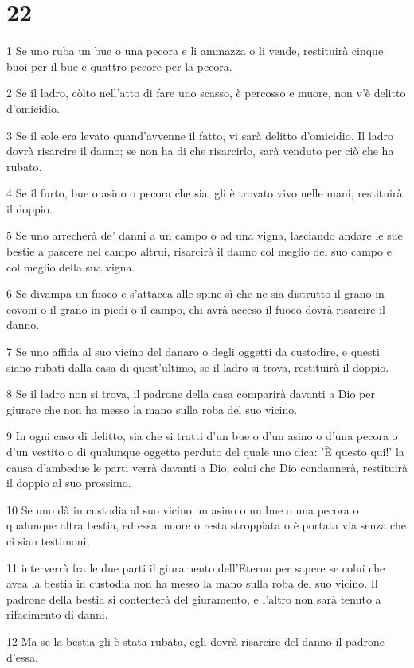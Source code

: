 \chapter{22}

\par 1 Se uno ruba un bue o una pecora e li ammazza o li vende, restituirà cinque buoi per il bue e quattro pecore per la pecora.
\par 2 Se il ladro, còlto nell'atto di fare uno scasso, è percosso e muore, non v'è delitto d'omicidio.
\par 3 Se il sole era levato quand'avvenne il fatto, vi sarà delitto d'omicidio. Il ladro dovrà risarcire il danno; se non ha di che risarcirlo, sarà venduto per ciò che ha rubato.
\par 4 Se il furto, bue o asino o pecora che sia, gli è trovato vivo nelle mani, restituirà il doppio.
\par 5 Se uno arrecherà de' danni a un campo o ad una vigna, lasciando andare le sue bestie a pascere nel campo altrui, risarcirà il danno col meglio del suo campo e col meglio della sua vigna.
\par 6 Se divampa un fuoco e s'attacca alle spine sì che ne sia distrutto il grano in covoni o il grano in piedi o il campo, chi avrà acceso il fuoco dovrà risarcire il danno.
\par 7 Se uno affida al suo vicino del danaro o degli oggetti da custodire, e questi siano rubati dalla casa di quest'ultimo, se il ladro si trova, restituirà il doppio.
\par 8 Se il ladro non si trova, il padrone della casa comparirà davanti a Dio per giurare che non ha messo la mano sulla roba del suo vicino.
\par 9 In ogni caso di delitto, sia che si tratti d'un bue o d'un asino o d'una pecora o d'un vestito o di qualunque oggetto perduto del quale uno dica: 'È questo qui!' la causa d'ambedue le parti verrà davanti a Dio; colui che Dio condannerà, restituirà il doppio al suo prossimo.
\par 10 Se uno dà in custodia al suo vicino un asino o un bue o una pecora o qualunque altra bestia, ed essa muore o resta stroppiata o è portata via senza che ci sian testimoni,
\par 11 interverrà fra le due parti il giuramento dell'Eterno per sapere se colui che avea la bestia in custodia non ha messo la mano sulla roba del suo vicino. Il padrone della bestia si contenterà del giuramento, e l'altro non sarà tenuto a rifacimento di danni.
\par 12 Ma se la bestia gli è stata rubata, egli dovrà risarcire del danno il padrone d'essa.
